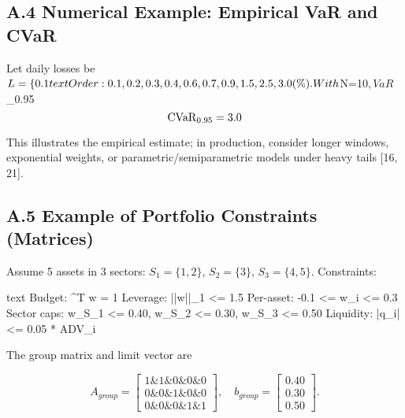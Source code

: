 \documentclass[11pt]{article}
\begin{document}
\subsection{A.4 Numerical Example: Empirical VaR and CVaR}

Let daily losses be $L=\{0.1\\%

text
Order: 0.1, 0.2, 0.3, 0.4, 0.6, 0.7, 0.9, 1.5, 2.5, 3.0 (\%).

With $N=10$, VaR$_{0.95}\\%

\begin{equation}
\mathrm{CVaR}_{0.95} = 3.0\\%
\end{equation}

This illustrates the empirical estimate; in production, consider longer windows, exponential weights, or parametric/semiparametric models under heavy tails [16, 21].

\subsection{A.5 Example of Portfolio Constraints (Matrices)}

Assume 5 assets in 3 sectors: $S_1=\{1,2\}$, $S_2=\{3\}$, $S_3=\{4,5\}$. Constraints:

text
Budget:        ^T w = 1
Leverage:      ||w||_1 <= 1.5
Per-asset:     -0.1 <= w_i <= 0.3
Sector caps:   w_{S_1} <= 0.40, w_{S_2} <= 0.30, w_{S_3} <= 0.50
Liquidity:     |q_i| <= 0.05 * ADV_i

The group matrix and limit vector are

\begin{equation}
A_{group} = \begin{bmatrix}
1 \& 1 \& 0 \& 0 \& 0\\
0 \& 0 \& 1 \& 0 \& 0\\
0 \& 0 \& 0 \& 1 \& 1
\end{bmatrix},\quad b_{group} = \begin{bmatrix}0.40\\0.30\\0.50\end{bmatrix}.
\end{equation}
\end{document}
